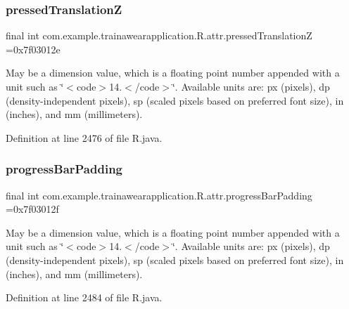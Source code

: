 \subsubsection{\texorpdfstring{pressedTranslationZ}{pressedTranslationZ}}
{\footnotesize\ttfamily final int com.\+example.\+trainawearapplication.\+R.\+attr.\+pressed\+TranslationZ =0x7f03012e\hspace{0.3cm}{\ttfamily [static]}}

May be a dimension value, which is a floating point number appended with a unit such as \char`\"{}$<$code$>$14.\+5sp$<$/code$>$\char`\"{}. Available units are\+: px (pixels), dp (density-\/independent pixels), sp (scaled pixels based on preferred font size), in (inches), and mm (millimeters). 

Definition at line 2476 of file R.\+java.

\mbox{\label{classcom_1_1example_1_1trainawearapplication_1_1_r_1_1attr_ac7d082a7ed8958addf2d0bafbdcb29cb}} 
\subsubsection{\texorpdfstring{progressBarPadding}{progressBarPadding}}
{\footnotesize\ttfamily final int com.\+example.\+trainawearapplication.\+R.\+attr.\+progress\+Bar\+Padding =0x7f03012f\hspace{0.3cm}{\ttfamily [static]}}

May be a dimension value, which is a floating point number appended with a unit such as \char`\"{}$<$code$>$14.\+5sp$<$/code$>$\char`\"{}. Available units are\+: px (pixels), dp (density-\/independent pixels), sp (scaled pixels based on preferred font size), in (inches), and mm (millimeters). 

Definition at line 2484 of file R.\+java.

\mbox{\label{classcom_1_1example_1_1trainawearapplication_1_1_r_1_1attr_a7f579cbe7f76759b6d547b8ffa043ab5}} 
